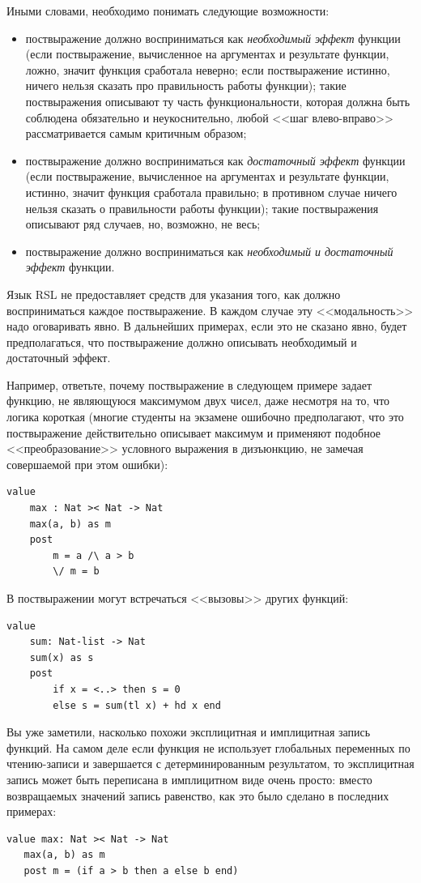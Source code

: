 \documentclass[14pt, twoside]{extreport}
\begin{document}
Иными словами, необходимо понимать следующие возможности:
\begin{itemize}
\item поствыражение должно восприниматься как  \emph{необходимый эффект} функции (если поствыражение, вычисленное на аргументах и результате функции, ложно, значит функция сработала неверно; если поствыражение истинно, ничего нельзя сказать про правильность работы функции); такие поствыражения описывают ту часть функциональности, которая должна быть соблюдена обязательно и неукоснительно, любой <<шаг влево-вправо>> рассматривается самым критичным образом;
\item поствыражение должно восприниматься как  \emph{достаточный эффект} функции (если поствыражение, вычисленное на аргументах и результате функции, истинно, значит функция сработала правильно; в противном случае ничего нельзя сказать о правильности работы функции); такие поствыражения описывают ряд случаев, но, возможно, не весь;
\item поствыражение должно восприниматься как  \emph{необходимый и достаточный эффект} функции.
\end{itemize}

Язык RSL не предоставляет средств для указания того, как должно восприниматься каждое поствыражение. В каждом случае эту <<модальность>> надо оговаривать явно. В дальнейших примерах, если это не сказано явно, будет предполагаться, что поствыражение должно описывать необходимый и достаточный эффект.

Например, ответьте, почему поствыражение в следующем примере задает функцию, не являющуюся максимумом двух чисел, даже несмотря на то, что логика короткая (многие студенты на экзамене ошибочно предполагают, что это поствыражение действительно описывает максимум и применяют подобное <<преобразование>> условного выражения в дизъюнкцию, не замечая совершаемой при этом ошибки):
\begin{lstlisting}
value
	max : Nat >< Nat -> Nat
	max(a, b) as m
	post
		m = a /\ a > b
		\/ m = b
\end{lstlisting}

В поствыражении могут встречаться <<вызовы>> других функций:
\begin{lstlisting}
value
	sum: Nat-list -> Nat
	sum(x) as s
	post
		if x = <..> then s = 0
		else s = sum(tl x) + hd x end
\end{lstlisting}

Вы уже заметили, насколько похожи эксплицитная и имплицитная запись функций. На самом деле если функция не использует глобальных переменных по чтению-записи и завершается с детерминированным результатом, то эксплицитная запись может быть переписана в имплицитном виде очень просто: вместо возвращаемых значений запись равенство, как это было сделано в последних примерах:
\begin{lstlisting}
value max: Nat >< Nat -> Nat
   max(a, b) as m
   post m = (if a > b then a else b end)
\end{lstlisting}
\end{document}
